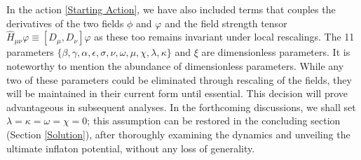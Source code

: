 \documentclass[aps,prd,reprint,preprintnumbers,showpacs,floatfix,nofootinbib,superscript address]{revtex4-2}
\newcommand{\wb}[1]{{\color[RGB]{255,0,0}{\textbf{\textit{[WB: #1]}}}}}
\begin{document}
In the action \cref{Starting Action}, we have also included terms that couples\wb{plural?} the derivatives of the two fields $\phi$ and $\varphi$ and the field strength tensor $\hat{H}_{\mu\nu}\varphi \equiv [D_\mu,D_\nu]\varphi$ as these too remains\wb{conjugation?} invariant under local rescalings. The 11 parameters $\{\beta, \gamma, \alpha, \epsilon, \sigma, \nu, \omega, \mu, \chi ,\lambda, \kappa\}$ and $\xi$ are dimensionless parameters. It is noteworthy to mention the abundance of dimensionless parameters. While any two of these parameters could be eliminated through rescaling of the fields, they will be maintained in their current form until essential. This decision will prove advantageous in subsequent analyses. In the forthcoming discussions, we shall set $\lambda = \kappa = \omega = \chi= 0$; this assumption can be restored in the concluding section (Section \cref{Solution}), after thoroughly examining the dynamics and unveiling the ultimate inflaton potential, without any loss of generality.
\end{document}
